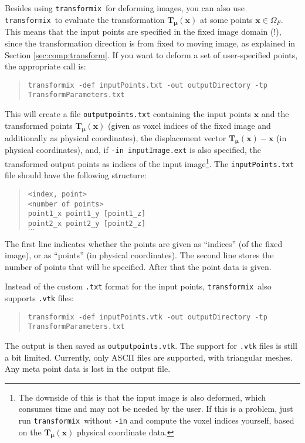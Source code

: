 \documentclass[]{report}
\newcommand{\transformix}{\texttt{transformix}}
\newcommand{\vx}{\bm{x}}
\newcommand{\vmu}{\bm{\mu}}
\newcommand{\vTmx}{\bm{T}_{\vmu}(\bm{x})}
\begin{document}
Besides using \transformix\ for deforming images, you can also use
\transformix\ to evaluate the transformation $\vTmx$ at some points
$\vx \in \Omega_F$. This means that the input points are specified
in the fixed image domain (!), since the transformation direction is
from fixed to moving image, as explained in Section
\ref{sec:comp:transform}. If you want to deform a set of
user-specified points, the appropriate call is:
\begin{quote}
\texttt{transformix -def inputPoints.txt -out outputDirectory -tp
TransformParameters.txt}
\end{quote}
This will create a file \texttt{outputpoints.txt} containing the
input points $\vx$ and the transformed points $\vTmx$ (given as
voxel indices of the fixed image and additionally as physical
coordinates), the displacement vector $\vTmx - \vx$ (in physical
coordinates), and, if \texttt{-in inputImage.ext} is also specified,
the transformed output points as indices of the input
image\footnote{The downside of this is that the input image is also
deformed, which consumes time and may not be needed by the user. If
this is a problem, just run \transformix\ without \texttt{-in} and
compute the voxel indices yourself, based on the $\vTmx$ physical
coordinate data.}. The \texttt{inputPoints.txt} file should have the
following structure:
\begin{quote}
\texttt{<index, point>}\\
\texttt{<number of points>}\\
\texttt{point1\_x point1\_y [point1\_z]}\\
\texttt{point2\_x point2\_y [point2\_z]}\\
\texttt{$\ldots$}
\end{quote}
The first line indicates whether the points are given as
``indices'' (of the fixed image), or as ``points'' (in physical
coordinates). The second line stores the number of points that
will be specified. After that the point data is given.

Instead of the custom \texttt{.txt} format for the input points, \transformix\
also supports \texttt{.vtk} files:
\begin{quote}
\texttt{transformix -def inputPoints.vtk -out outputDirectory -tp
TransformParameters.txt}
\end{quote}
The output is then saved as \texttt{outputpoints.vtk}. The support
for \texttt{.vtk} files is still a bit limited. Currently, only
ASCII files are supported, with triangular meshes. Any meta point
data is lost in the output file.
\end{document}

